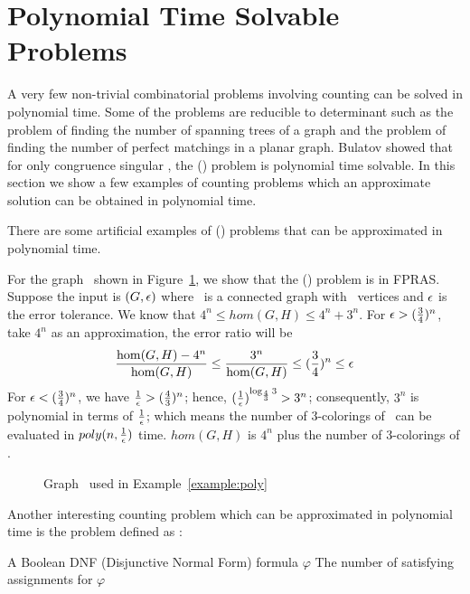 \section{Polynomial Time Solvable Problems}
A very few non-trivial combinatorial problems involving counting 
can be solved in polynomial time.
Some of the problems are reducible to determinant such as
the problem of finding the number of spanning trees of a graph and 
the problem of finding the number of perfect matchings in a planar graph.
Bulatov \cite{Bulatov} showed that for only congruence singular \mrelset, the \ccsp(\mrelset)
problem  is polynomial time solvable. In this section we show a few 
examples of counting problems which an approximate solution can be obtained in polynomial time.

There are some artificial examples of \ccsp(\mrelset) problems that can be approximated 
in polynomial time. 

\begin{example} \label{example:poly}
For the graph \mH\ shown in Figure~\ref{fig:approxible},
we show that the \chom(\mH) problem is in FPRAS\@. Suppose the input is 
\((G,\epsilon)\) where \mG\ is a connected graph with \mn\ vertices and \(\epsilon\)
is the error tolerance.
We know that 
\(4^n\le hom(G,H) \le 4^n+3^n\)\@.
For \(\epsilon > (\frac{3}{4})^n\), take \(4^n\) as an approximation, the error ratio will  be
\[\frac{\hom(G,H)-4^n}{\hom(G,H)} \le \frac{3^n}{\hom(G,H)} \le (\frac{3}{4})^n \le \epsilon\]
For \(\epsilon < (\frac{3}{4})^n\), we have \(\frac{1}{\epsilon}>(\frac{4}{3})^n \);
hence, \((\frac{1}{\epsilon})^{\log_{\frac{4}{3}}3} > 3^n\); consequently, \(3^n\) is polynomial 
in terms of \(\frac{1}{\epsilon}\); which means the number of 3-colorings of \mG\ can be evaluated in 
\(poly(n,\frac{1}{\epsilon})\) time. 
\(hom(G,H)\) is \(4^n\) plus the number of 3-colorings of \mG\@.

\begin{figure}[h]
\center
\caption{Graph \mG\ used in Example~\ref{example:poly}}
\label{fig:approxible}
\end{figure}
\end{example}

Another interesting counting problem which can be approximated in polynomial time is 
the  problem defined as :

\pnndef %
{A Boolean DNF (Disjunctive Normal Form) formula \(\varphi\)}
{The number of satisfying assignments for \(\varphi\)}

